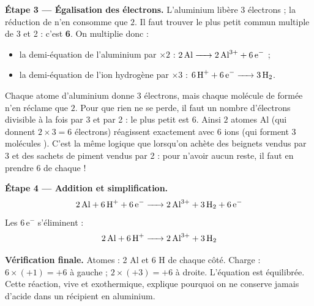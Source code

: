 \documentclass[11pt]{article}
\newcommand{\cle}[1]{{\popxbold\color{popdark}#1}}
\begin{document}
\textbf{Étape 3 — Égalisation des électrons.} L'aluminium libère $3$ électrons ; la réduction de  n'en consomme que $2$. Il faut trouver le \cle{plus petit commun multiple} de 3 et 2 : c'est \textbf{6}. On multiplie donc :
\begin{itemize}
\item la demi-équation de l'aluminium par $\times 2$ : $\ce{2Al -> 2Al^3+ + 6e-}$ ;
\item la demi-équation de l'ion hydrogène par $\times 3$ : $\ce{6H+ + 6e- -> 3H2}$.
\end{itemize}

\begin{exemplebox}
Chaque atome d'aluminium donne $3$ électrons, mais chaque molécule de  formée n'en réclame que $2$. Pour que rien ne se perde, il faut un nombre d'électrons divisible à la fois par 3 et par 2 : le plus petit est $6$. Ainsi $2$ atomes Al (qui donnent $2\times 3 = 6$ électrons) réagissent exactement avec $6$ ions  (qui forment $3$ molécules ). C'est la même logique que lorsqu'on achète des beignets vendus par 3 et des sachets de piment vendus par 2 : pour n'avoir aucun reste, il faut en prendre 6 de chaque !
\end{exemplebox}

\textbf{Étape 4 — Addition et simplification.}
\[ \ce{2Al + 6H+ + 6e- -> 2Al^3+ + 3H2 + 6e-} \]
Les $6\,\text{e}^-$ s'éliminent :
\[ \ce{2Al + 6H+ -> 2Al^3+ + 3H2} \]

\textbf{Vérification finale.} Atomes : 2 Al et 6 H de chaque côté. Charge : $6\times(+1) = +6$ à gauche ; $2\times(+3) = +6$ à droite. L'équation est équilibrée. Cette réaction, vive et exothermique, explique pourquoi on ne conserve jamais d'acide dans un récipient en aluminium.
\end{document}
